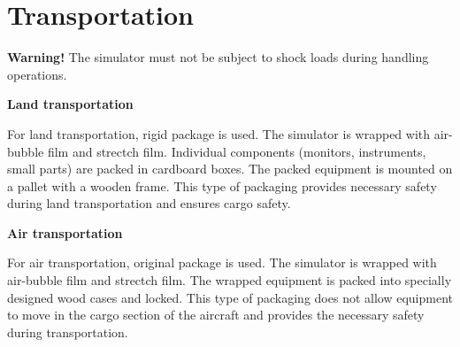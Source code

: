 \ifIsLngEng
{
    \section{Transportation}

    {\textcolor[rgb]{1,0,0}{\textbf{Warning!}}} The simulator must not be subject to shock loads during handling operations.
    
    \textbf{Land transportation}
    
    For land transportation,  rigid package is used.  
    The simulator is wrapped with air-bubble film and strectch film.
    Individual components (monitors, instruments, small parts) are packed in cardboard boxes.
    The packed equipment is mounted on a pallet with a wooden frame.
    This type of packaging provides necessary safety during land transportation and ensures cargo safety.
    
    \textbf{Air transportation}
    
    For air transportation,  original package is used.  
    The simulator is wrapped with air-bubble film and strectch film. 
    The wrapped equipment is packed into specially designed wood cases and locked. 
    This type of packaging does not allow equipment to move in the cargo section of the aircraft and provides the necessary safety during transportation.
}
\fi


